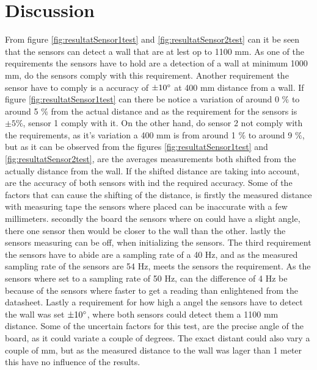 \section*{Discussion}
From figure \ref{fig:resultatSensor1test} and \ref{fig:resultatSensor2test} can it be seen that the sensors can detect a wall that are at lest op to 1100 mm. As one of the requirements the sensors have to hold are a detection of a wall at minimum 1000 mm, do the sensors comply with this requirement.
\newline
\newline
Another requirement the sensor have to comply is a accuracy of $\pm 10 \degree$ at 400 mm distance from a wall. If figure \ref{fig:resultatSensor1test} can there be notice a variation of around 0 $\%$ to around 5 $\%$ from the actual distance and as the requirement for the sensors is $\pm 5 \%$, sensor 1 comply with it. On the other hand, do sensor 2 not comply with the requirements, as it's variation a 400 mm is from around 1 $\%$ to around 9 $\%$, but as it can be observed from the figures \ref{fig:resultatSensor1test} and \ref{fig:resultatSensor2test}, are the averages measurements both shifted from the actually distance from the wall. If the shifted distance are taking into account, are the accuracy of both sensors with ind the required accuracy. 
\newline
\newline
Some of the factors that can cause the shifting of the distance, is firstly the measured distance with measuring tape the sensors where placed can be inaccurate with a few millimeters. secondly the board the sensors where on could have a slight angle, there one sensor then would be closer to the wall than the other. lastly the sensors measuring can be off, when initializing the sensors.
\newline
\newline
The third requirement the sensors have to abide are a sampling rate of a 40 Hz, and as the measured sampling rate of the sensors are 54 Hz, meets the sensors the requirement. As the sensors where set to a sampling rate of 50 Hz, can the difference of 4 Hz be because of the sensors where faster to get a reading than enlightened from the datasheet.
\newline
\newline
Lastly a requirement for how high a angel the sensors have to detect the wall was set $\pm 10 \degree$, where both sensors could detect them a 1100 mm distance. Some of the uncertain factors for this test, are the precise angle of the board, as it could variate a couple of degrees. The exact distant could also vary a couple of mm, but as the measured distance to the wall was lager than 1 meter this have no influence of the results.

